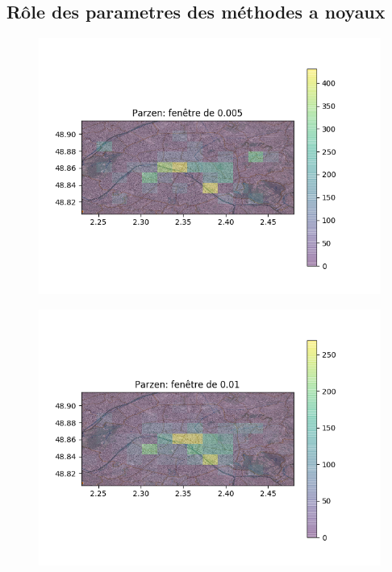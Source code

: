 \documentclass[a4paper]{article}
\begin{document}
\subsection*{Rôle des parametres des méthodes a noyaux}

\begin{figure}[ht!]
\begin{center}
\begin{minipage}{0.45\textwidth}
\includegraphics[scale=0.5]{Parzen0005.png}
\label{f1_trajectoire}
\end{minipage}\hfill
\begin{minipage}{0.45\textwidth}
\includegraphics[scale=0.5]{Parzen001.png}
\label{f2_trajectoire}
\end{minipage}
\end{center}
\end{figure}
\end{document}
